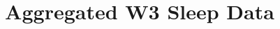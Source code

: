 \documentclass[
  letterpaper,
  DIV=11,
  numbers=noendperiod]{scrartcl}
\title{Aggregated W3 Sleep Data}
\author{}
\date{}
\begin{document}
\maketitle


\subsection{}\label{section}
\end{document}

